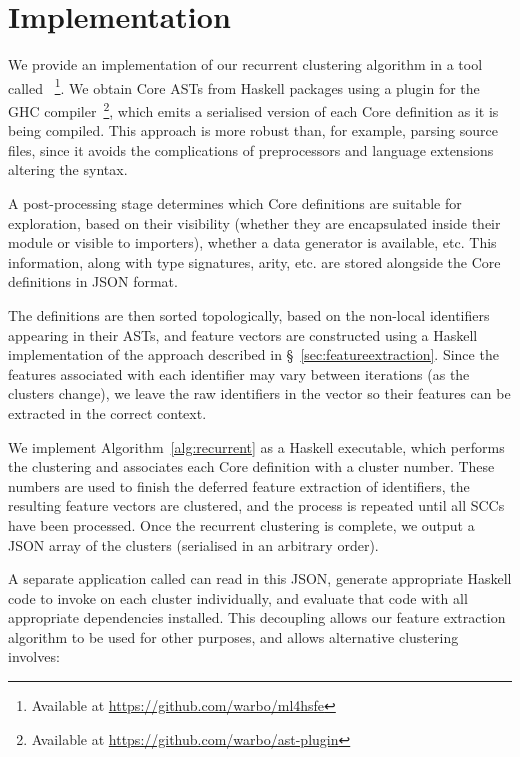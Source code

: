 \section{Implementation}
\label{sec:implementation}

We provide an implementation of our recurrent clustering algorithm in a tool
called \mlforhs{}~\footnote{Available at
  \url{https://github.com/warbo/ml4hsfe}}. We obtain Core ASTs from Haskell
packages using a plugin for the GHC compiler~\footnote{Available at
  \url{https://github.com/warbo/ast-plugin}}, which emits a serialised version
of each Core definition as it is being compiled. This approach is more robust
than, for example, parsing source files, since it avoids the complications of
preprocessors and language extensions altering the syntax.

A post-processing stage determines which Core definitions are suitable for
exploration, based on their visibility (whether they are encapsulated inside
their module or visible to importers), whether a data generator is available,
etc. This information, along with type signatures, arity, etc. are stored
alongside the Core definitions in JSON format.

The definitions are then sorted topologically, based on the non-local
identifiers appearing in their ASTs, and feature vectors are constructed using a
Haskell implementation of the approach described in
\S~\ref{sec:featureextraction}. Since the features associated with each
identifier may vary between iterations (as the clusters change), we leave the
raw identifiers in the vector so their features can be extracted in the correct
context.

We implement Algorithm~\ref{alg:recurrent} as a Haskell executable, which
performs the clustering and associates each Core definition with a cluster
number. These numbers are used to finish the deferred feature extraction of
identifiers, the resulting feature vectors are clustered, and the process is
repeated until all SCCs have been processed. Once the recurrent clustering is
complete, we output a JSON array of the clusters (serialised in an arbitrary
order).

\iffalse
A separate application called \mlspec{} can read in this JSON, generate
appropriate Haskell code to invoke \quickspec{} on each cluster individually,
and evaluate that code with all appropriate dependencies installed. This
decoupling allows our feature extraction algorithm to be used for other
purposes, and allows alternative clustering involves:

